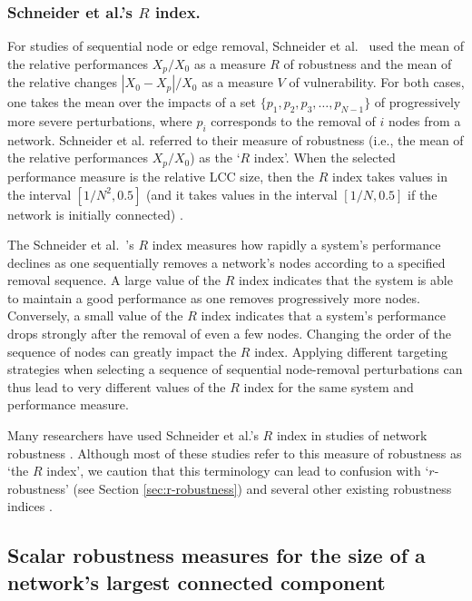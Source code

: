 \documentclass{comnet-mod}
\begin{document}
\subsubsection{Schneider et al.'s $R$ index.} 

For studies of sequential node or edge removal, Schneider et al.~\cite{Schneider2011} used the mean of the relative performances $X_p/X_0$ as a measure $R$ of robustness and the mean of the relative changes $|X_0 - X_p|/X_0$ as a measure $V$ of vulnerability. For both cases, one takes the mean over the impacts of a set $\{p_1,p_2,p_3, \ldots, p_{N-1}\}$ of progressively more severe perturbations, where $p_i$ corresponds to the removal of $i$ nodes from a network. 
Schneider et al. referred to their measure of robustness (i.e., the mean of the relative performances $X_p/X_0$) as the `$R$ index'. When the selected performance measure is the relative LCC size, then the $R$ index takes values in the interval $[1/N^2, 0.5]$ (and it takes values in the interval $[1/N,0.5]$ if the network is initially connected) \cite{Schneider2011}. 

The Schneider et al.~'s $R$ index measures how rapidly a system's performance declines as one sequentially removes a network's nodes according to a specified removal sequence. A large value of the $R$ index indicates that the system is able to maintain a good performance as one removes progressively more nodes. Conversely, a small value of 
the $R$ index indicates that a system's performance drops strongly after the removal of even a few nodes. Changing the order of the sequence of nodes can greatly impact the $R$ index. Applying different targeting strategies when selecting a sequence of sequential node-removal perturbations can thus lead to very different values of the $R$ index for the same system and performance measure.

Many researchers have used Schneider et al.'s $R$ index in studies of network robustness \cite{Herrmann2011, Mello2011, Mello2011a, Schneider2011, Zeng2012, Iyer2013, Louzada2013, Ventresca2014, Zhou2014, Ahmadi2015, Hong2017}. Although most of these studies refer to this measure of robustness as `the $R$ index', we caution that this terminology can lead to confusion with `$r$-robustness' (see Section \ref{sec:r-robustness}) and several other existing robustness indices \cite{Wilhelm2004, Gorban2007, Fang2023}.


\subsection{Scalar robustness measures for the size of a network's largest connected component}\label{sec:scalar_robustness_lcc}
\end{document}
